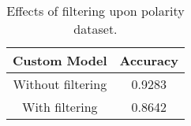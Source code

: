 \begin{center}
        \vspace{-3.0em}
        \begin{table}
            \let\TPToverlap=\TPTrlap    
            \centering
            \caption{Effects of filtering upon polarity dataset.}
            \vspace{-1.0em}
            \begin{threeparttable}
                    \begin{tabular}{cc}
                        \toprule
                        \textbf{Custom Model} & \textbf{Accuracy} \\ \hline
                        Without filtering & 0.9283 \\
                        With filtering & 0.8642 \\
                        \bottomrule
                    \end{tabular}
                    \label{tab:filter}
            \end{threeparttable}
        \end{table}
\end{center}

